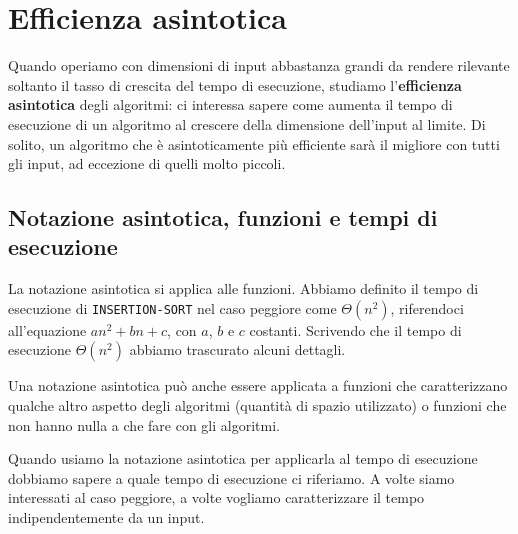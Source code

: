\documentclass[11pt,a4paper]{article}
\begin{document}
\section{Efficienza asintotica}
Quando operiamo con dimensioni di input abbastanza grandi da rendere rilevante soltanto il tasso di crescita del tempo di esecuzione, studiamo l’\textbf{efficienza asintotica} degli algoritmi: ci interessa sapere come aumenta il tempo di esecuzione di un algoritmo al crescere della dimensione dell’input al limite. Di solito, un algoritmo che è asintoticamente più efficiente sarà il migliore con tutti gli input, ad eccezione di quelli molto piccoli.

\subsection{Notazione asintotica, funzioni e tempi di esecuzione}
La notazione asintotica si applica alle funzioni. Abbiamo definito il tempo di esecuzione di \texttt{INSERTION-SORT} nel caso peggiore come $\Theta(n^2)$, riferendoci all’equazione $an^2+bn+c$, con $a$, $b$ e $c$ costanti. Scrivendo che il tempo di esecuzione $\Theta(n^2)$ abbiamo trascurato alcuni dettagli.

Una notazione asintotica può anche essere applicata a funzioni che caratterizzano qualche altro aspetto degli algoritmi (quantità di spazio utilizzato) o funzioni che non hanno nulla a che fare con gli algoritmi.

Quando usiamo la notazione asintotica per applicarla al tempo di esecuzione dobbiamo sapere a quale tempo
di esecuzione ci riferiamo. A volte siamo interessati al caso peggiore, a volte vogliamo caratterizzare il tempo indipendentemente da un input.
\end{document}
